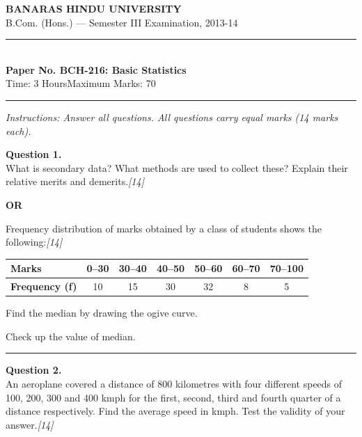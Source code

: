 \documentclass[11pt,a4paper]{article}
\newcommand{\pts}[1]{\hfill   \textit{[#1]}}
\begin{document}
\begin{center}
  {\large\bfseries BANARAS HINDU UNIVERSITY}\\[2pt]
  {\normalsize B.Com. (Hons.) --- Semester III Examination, 2013-14}\\[6pt]
  \rule{0.8\linewidth}{0.5pt}\\[6pt]
  {\large\bfseries Paper No. BCH-216: Basic Statistics}\\[4pt]
  {\normalsize Time: 3 Hours\hfill Maximum Marks: 70}
\end{center}

\rule{\linewidth}{0.4pt}

\smallskip



\noindent   \textit{Instructions: Answer all questions. All questions carry equal marks (14 marks each).}

\bigskip




\noindent   \textbf{Question 1.} \\
What is secondary data? What methods are used to collect these? Explain their relative merits and demerits.\pts{14}

\centerline{   \textbf{OR}}

Frequency distribution of marks obtained by a class of students shows the following:\pts{14}

\begin{center}
\renewcommand{\arraystretch}{1.2}

\begin{tabular}{|l|c|c|c|c|c|c|}
\hline
   \textbf{Marks} & 0--30 & 30--40 & 40--50 & 50--60 & 60--70 & 70--100 \\ \hline
   \textbf{Frequency (f)} & 10 & 15 & 30 & 32 & 8 & 5 \\ \hline
\end{tabular}
\end{center}

\begin{parts}
  \item Find the median by drawing the ogive curve.
  \item Check up the value of median.
\end{parts}

\medskip\rule{\linewidth}{0.2pt}




\noindent   \textbf{Question 2.} \\
An aeroplane covered a distance of 800 kilometres with four different speeds of 100, 200, 300 and 400 kmph for the first, second, third and fourth quarter of a distance respectively. Find the average speed in kmph. Test the validity of your answer.\pts{14}
\end{document}
